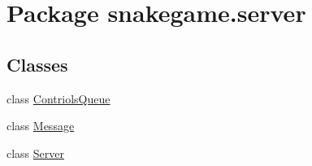 \hypertarget{namespacesnakegame_1_1server}{}\section{Package snakegame.\+server}
\label{namespacesnakegame_1_1server}
\subsection*{Classes}
\begin{DoxyCompactItemize}
\item 
class \mbox{\hyperlink{classsnakegame_1_1server_1_1_contriols_queue}{Contriols\+Queue}}
\item 
class \mbox{\hyperlink{classsnakegame_1_1server_1_1_message}{Message}}
\item 
class \mbox{\hyperlink{classsnakegame_1_1server_1_1_server}{Server}}
\end{DoxyCompactItemize}
